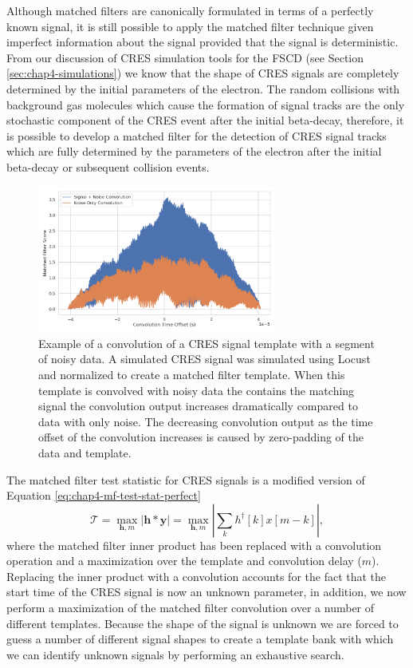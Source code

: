 Although matched filters are canonically formulated in terms of a perfectly known signal, it is still possible to apply the matched filter technique given imperfect information about the signal provided that the signal is deterministic. From our discussion of CRES simulation tools for the FSCD (see Section \ref{sec:chap4-simulations}) we know that the shape of CRES signals are completely determined by the initial parameters of the electron. The random collisions with background gas molecules which cause the formation of signal tracks are the only stochastic component of the CRES event after the initial beta-decay, therefore, it is possible to develop a matched filter for the detection of CRES signal tracks which are fully determined by the parameters of the electron after the initial beta-decay or subsequent collision events.

\begin{figure}[htbp]
    \centering
    \includegraphics*[width=0.7\textwidth]{figs/Chapter-4/220318_example_convolution.png}
    \caption{Example of a convolution of a CRES signal template with a segment of noisy data. A simulated CRES signal was simulated using Locust and normalized to create a matched filter template. When this template is convolved with noisy data the contains the matching signal the convolution output increases dramatically compared to data with only noise. The decreasing convolution output as the time offset of the convolution increases is caused by zero-padding of the data and template. }
\end{figure}

The matched filter test statistic for CRES signals is a modified version of Equation \ref{eq:chap4-mf-test-stat-perfect}
\begin{equation}
    \mathcal{T} = \max_{\bm{h},m}\left|\bm{h}\ast\bm{y}\right|=\max_{\bm{h},m}\left|\sum_{k}h^\dagger[k]x[m-k]\right|,
    \label{eq:chap4-mf-test-stat-conv}
\end{equation}
where the matched filter inner product has been replaced with a convolution operation and a maximization over the template and convolution delay ($m$). Replacing the inner product with a convolution accounts for the fact that the start time of the CRES signal is now an unknown parameter, in addition, we now perform a maximization of the matched filter convolution over a number of different templates. Because the shape of the signal is unknown we are forced to guess a number of different signal shapes to create a template bank with which we can identify unknown signals by performing an exhaustive search.

